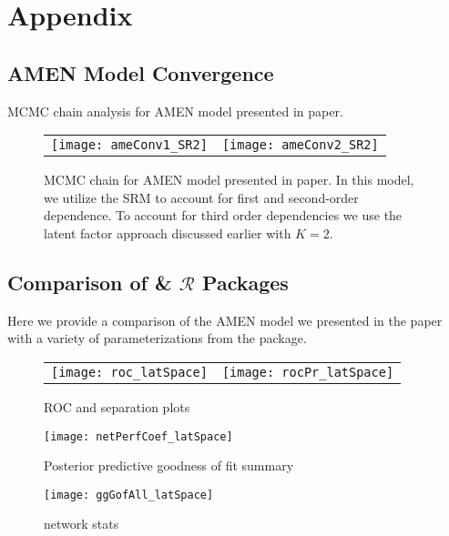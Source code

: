 \clearpage
\section{\textbf{Appendix}}

\subsection{AMEN Model Convergence}

MCMC chain analysis for AMEN model presented in paper.  

\begin{figure}[ht]
	\centering
	\begin{tabular}{cc}
	\texttt{[image: ameConv1\_SR2]} &
	\texttt{[image: ameConv2\_SR2]}
	\end{tabular}
	\caption{MCMC chain for AMEN model presented in paper. In this model, we utilize the SRM to account for first and second-order dependence. To account for third order dependencies we use the latent factor approach discussed earlier with $K=2$.}
	\label{fig:ameConv}
\end{figure}
\FloatBarrier
\newpage

\subsection{Comparison of  \&  $\mathcal{R}$ Packages}

Here we provide a comparison of the AMEN model we presented in the paper with a variety of parameterizations from the  package. 



\begin{figure}[ht]
	\centering
	\begin{tabular}{cc}
	\texttt{[image: roc\_latSpace]} & 
	\texttt{[image: rocPr\_latSpace]}
	\end{tabular}
	\caption{ROC and separation plots}
	\label{fig:roc_latentSpace}
\end{figure}

\begin{figure}[ht]
	\centering
	\texttt{[image: netPerfCoef\_latSpace]}
	\caption{Posterior predictive goodness of fit summary}
	\label{fig:netPerfCoef_latSpace}
\end{figure}

\begin{figure}[ht]
	\centering
	\texttt{[image: ggGofAll\_latSpace]}
	\caption{network stats }
	\label{fig:gofAll_latSpace}
\end{figure}
\FloatBarrier
\newpage

